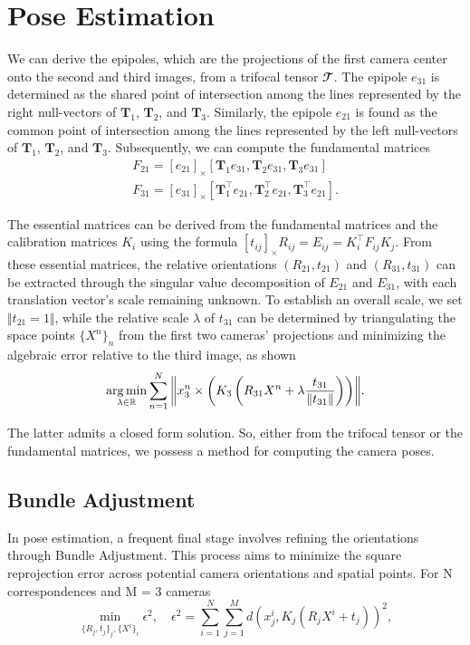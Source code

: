 \section{Pose Estimation}\label{sec:estimation}
We can derive the epipoles, which are the projections of the first camera center onto the second and third images, from a trifocal tensor \( \mathbfcal{T} \). The epipole \( e_{31} \) is determined as the shared point of intersection among the lines represented by the right null-vectors of \( \bm{T}_1 \), \( \bm{T}_2 \), and \( \bm{T}_3 \). Similarly, the epipole \( e_{21} \) is found as the common point of intersection among the lines represented by the left null-vectors of \( \bm{T}_1 \), \( \bm{T}_2 \), and \( \bm{T}_3 \). Subsequently, we can compute the fundamental matrices
\begin{equation}
	\begin{gathered}
		F_{21} = [e_{21}]_{\times}[\bm{T}_1e_{31}, \bm{T}_2e_{31}, \bm{T}_3e_{31}]\\
		F_{31} = [e_{31}]_{\times}[\bm{T}_1^\top e_{21}, \bm{T}_2^\top e_{21}, \bm{T}_3^\top e_{21}].
	\end{gathered}
\end{equation}

The essential matrices can be derived from the fundamental matrices and the calibration matrices \( K_i \) using the formula \( [t_{ij}]_{\times}R_{ij} = E_{ij} = K_i^\top F_{ij}K_j \). From these essential matrices, the relative orientations \( (R_{21}, t_{21}) \) and \( (R_{31}, t_{31}) \) can be extracted through the singular value decomposition of \( E_{21} \) and \( E_{31} \), with each translation vector's scale remaining unknown. To establish an overall scale, we set \( \Vert t_{21} = 1 \Vert \), while the relative scale \( \lambda \) of \( t_{31} \) can be determined by triangulating the space points \( \{X^n\}_n \) from the first two cameras' projections and minimizing the algebraic error relative to the third image, as shown
\begin{equation}
	\operatorname*{arg\,min}_{\lambda \in \mathbb{R}}{\sum_{n = 1}^{N}{\left\Vert x_3^n \times \left( K_3 \left( R_{31}X^n + \lambda \frac{t_{31}}{\Vert t_{31} \Vert} \right) \right) \right\Vert}}.
\end{equation}

The latter admits a closed form solution. So, either from the trifocal tensor or the fundamental matrices, we possess a method for computing the camera poses.

\subsection{Bundle Adjustment}
In pose estimation, a frequent final stage involves refining the orientations through Bundle Adjustment. This process aims to minimize the square reprojection error across potential camera orientations and spatial points. For N correspondences and M = 3 cameras
\begin{equation}
	\min_{\{ R_j, t_j \}_j, \{ X^i \}_i}{\epsilon^2}, \quad \epsilon^2 = \sum_{i = 1}^{N}{\sum_{j = 1}^{M}{d \left( x_j^i, K_j(R_jX^i + t_j) \right)^2}},
\end{equation}

